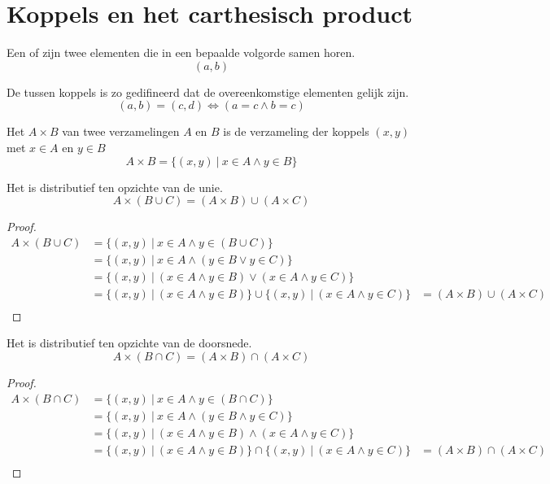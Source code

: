 \documentclass[main.tex]{subfiles}
\begin{document}
\section{Koppels en het carthesisch product}
\label{sec:koppels-en-het-carthesisch-product}

\begin{de}
  Een  of  zijn twee elementen die in een bepaalde volgorde samen horen.
  \[ (a,b) \]
\end{de}

\begin{de}
  De  tussen koppels is zo gedifineerd dat de overeenkomstige elementen gelijk zijn.
  \[ (a,b) = (c,d) \Leftrightarrow (a = c \wedge b = c) \] 
\end{de}

\begin{de}
  Het  $A \times B$ van twee verzamelingen $A$ en $B$ is de verzameling der koppels $(x,y)$ met $x \in A$ en $y \in B$
  \[ A \times B = \{ (x,y) \ |\ x \in A \wedge y \in B \} \]
\end{de}

\begin{st}
  Het  is distributief ten opzichte van de unie.
  \[ A \times (B \cup C) = (A \times B) \cup (A \times C) \] 
  \begin{proof}
    \[
    \begin{array}{rll}
    A \times (B \cup C) &= \{ (x,y) \ |\ x \in A \wedge y \in (B \cup C) \}&\\
                        &= \{ (x,y) \ |\ x \in A \wedge (y \in B \vee y \in C) \}&\\
                        &= \{ (x,y) \ |\ (x \in A \wedge y \in B) \vee (x \in A \wedge y \in C) \}&\\
                        &= \{ (x,y) \ |\ (x \in A \wedge y \in B)\} \cup \{ (x,y) \ |\ (x \in A \wedge y \in C) \} &= (A \times B) \cup (A \times C)\\
    \end{array}
    \]
  \end{proof}
\end{st}
\begin{st}
  Het  is distributief ten opzichte van de doorsnede.
  \[ A \times (B \cap C) = (A \times B) \cap (A \times C) \] 
  \begin{proof}
    \[
    \begin{array}{rll}
    A \times (B \cap C) &= \{ (x,y) \ |\ x \in A \wedge y \in (B \cap C) \}&\\
                        &= \{ (x,y) \ |\ x \in A \wedge (y \in B \wedge y \in C) \}&\\
                        &= \{ (x,y) \ |\ (x \in A \wedge y \in B) \wedge (x \in A \wedge y \in C) \}&\\
                        &= \{ (x,y) \ |\ (x \in A \wedge y \in B)\} \cap \{ (x,y) \ |\ (x \in A \wedge y \in C) \} &= (A \times B) \cap (A \times C)\\
    \end{array}
    \]
  \end{proof}
\end{st}
\end{document}
